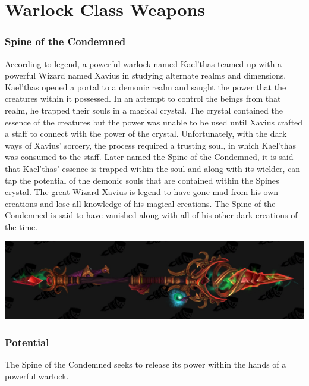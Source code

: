 \section{Warlock Class Weapons}

\subsubsection{Spine of the Condemned}

According to legend, a powerful warlock named Kael'thas teamed up with a powerful Wizard named Xavius in studying alternate realms and dimensions. Kael'thas opened a portal to a demonic realm and saught the power that the creatures within it possessed. In an attempt to control the beings from that realm, he trapped their souls in a magical crystal. The crystal contained the essence of the creatures but the power was unable to be used until Xavius crafted a staff to connect with the power of the crystal. Unfortunately, with the dark ways of Xavius' sorcery, the process required a trusting soul, in which Kael'thas was consumed to the staff. Later named the Spine of the Condemned, it is said that Kael'thas' essence is trapped within the soul and along with its wielder, can tap the potential of the demonic souls that are contained within the Spines crystal. The great Wizard Xavius is legend to have gone mad from his own creations and lose all knowledge of his magical creations. The Spine of the Condemned is said to have vanished along with all of his other dark creations of the time.

\begin{center}
	\includegraphics[width=\linewidth]{img/weapons/532325-ebonchill-fire-mage-artifact.jpg}
\end{center}

\subsubsection{Potential}

The Spine of the Condemned seeks to release its power within the hands of a powerful warlock. 

